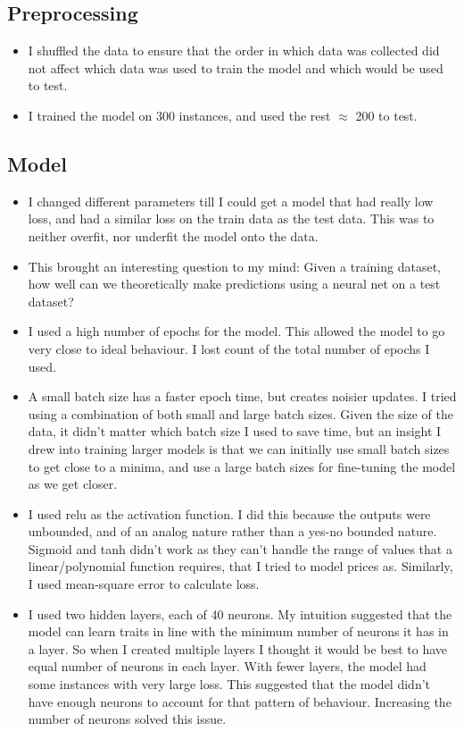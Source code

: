 \documentclass[12pt,a4paper]{article}
\begin{document}
\subsection{Preprocessing}
\begin{itemize}
\item I shuffled the data to ensure that the order in which data was collected did not affect which data was used to train the model and which would be used to test.
\item I trained the model on 300 instances, and used the rest $\approx$ 200 to test. 

\end{itemize}
\subsection{Model}
\begin{itemize}
\item I changed different parameters till I could get a model that had really low loss, and had a similar loss on the train data as the test data. This was to neither overfit, nor underfit the model onto the data.
\item This brought an interesting question to my mind: Given a training dataset, how well can we theoretically make predictions using a neural net on a test dataset?
\item I used a high number of epochs for the model. This allowed the model to go very close to ideal behaviour. I lost count of the total number of epochs I used.
\item A small batch size has a faster epoch time, but creates noisier updates. I tried using a combination of both small and large batch sizes. Given the size of the data, it didn't matter which batch size I used to save time, but an insight I drew into training larger models is that we can initially use small batch sizes to get close to a minima, and use a large batch sizes for fine-tuning the model as we get closer.
\item I used relu as the activation function. I did this because the outputs were unbounded, and of an analog nature rather than a yes-no bounded nature. Sigmoid and tanh didn't work as they can't handle the range of values that a linear/polynomial function requires, that I tried to model prices as. Similarly, I used mean-square error to calculate loss.
\item I used two hidden layers, each of 40 neurons. My intuition suggested that the model can learn traits in line with the minimum number of neurons it has in a layer. So when I created multiple layers I thought it would be best to have equal number of neurons in each layer. With fewer layers, the model had some instances with very large loss. This suggested that the model didn't have enough neurons to account for that pattern of behaviour. Increasing the number of neurons solved this issue.

\end{itemize}
\end{document}
